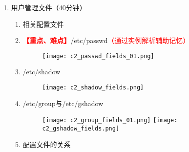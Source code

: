 \documentclass{TIJMUjiaoanLL}
\begin{document}
\begin{enumerate}
  \item 用户管理文件（40分钟）
    \begin{enumerate}
      \item 相关配置文件
	\item \textcolor{red}{\textbf{【重点、难点】}}/etc/passwd\textcolor{red}{（通过实例解析辅助记忆）}
	\vspace*{-10pt}
	\begin{figure}[h]
	  \centering
	  \texttt{[image: c2\_passwd\_fields\_01.png]}
	\end{figure}

      \item /etc/shadow
	\vspace*{-10pt}
	\begin{figure}[h]
	  \centering
	  \texttt{[image: c2\_shadow\_fields.png]}
	\end{figure}

	\vspace*{-25pt}
      \item /etc/group与/etc/gshadow
	\vspace*{-10pt}
	\begin{figure}[h]
	  \centering
	  \texttt{[image: c2\_group\_fields\_01.png]}
	  \quad
	  \texttt{[image: c2\_gshadow\_fields.png]}
	\end{figure}

\otherTail
\newpage
\otherHeader

      \item 配置文件的关系
    \end{enumerate}


\end{enumerate}
\end{document}
